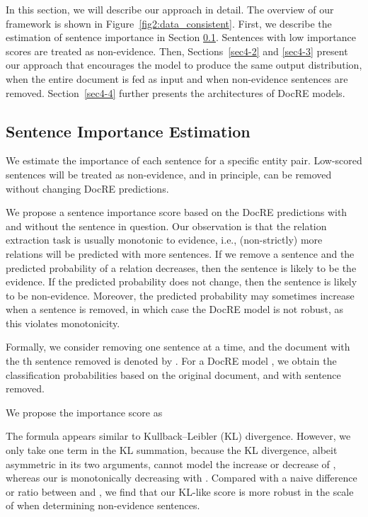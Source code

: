 \documentclass[11pt]{article}
\begin{document}
In this section, we will describe our approach in detail.
The overview of our framework is shown in Figure~\ref{fig2:data_consistent}.
First, we describe the estimation of sentence importance in Section \ref{sec4-1}.
Sentences with low importance scores are treated as non-evidence.
Then, Sections~\ref{sec4-2} and \ref{sec4-3} present our approach that encourages the model to produce the same output distribution, when the entire document is fed as input and when  non-evidence sentences are removed.
 Section~\ref{sec4-4} further presents the architectures of DocRE models.

\subsection{Sentence Importance Estimation}
\label{sec4-1}
We estimate the importance of each sentence for a specific entity pair. Low-scored sentences will be treated as non-evidence, and in principle, can be removed without changing DocRE predictions. 

We propose a sentence importance score based on the DocRE predictions with and without the sentence in question. 
Our observation is that the relation extraction task is usually monotonic to evidence, i.e., (non-strictly) more relations will be predicted with more sentences. 
If we remove a sentence and the predicted probability of a relation decreases, then the sentence is likely to be the evidence.
If the predicted probability does not change, then the sentence is likely to be non-evidence. Moreover, the predicted probability may sometimes increase when a sentence is removed, in which case the DocRE model is not robust, as this violates monotonicity.

Formally, we consider removing one sentence at a time, and the document with the th sentence removed is denoted by .
For a DocRE model , we obtain the classification probabilities  based on the original document, and  with sentence  removed.

We propose the importance score as 


The formula appears similar to Kullback--Leibler (KL) divergence. 
However, we only take one term in the KL summation, because the KL divergence, albeit asymmetric in its two arguments, cannot model the increase or decrease of , whereas our  is monotonically decreasing with . 
Compared with a naive difference or ratio between  and , we find that our KL-like score is more robust in the scale of  when determining non-evidence sentences.
\end{document}
